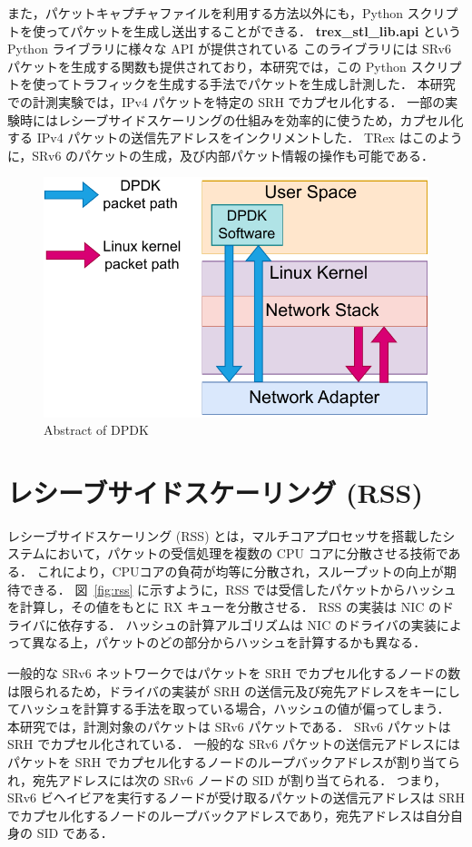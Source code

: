 また，パケットキャプチャファイルを利用する方法以外にも，Python スクリプトを使ってパケットを生成し送出することができる．
\textbf{trex\_stl\_lib.api} という Python ライブラリに様々な API が提供されている
このライブラリには SRv6 パケットを生成する関数も提供されており，本研究では，この Python スクリプトを使ってトラフィックを生成する手法でパケットを生成し計測した．
本研究での計測実験では，IPv4 パケットを特定の SRH でカプセル化する．
一部の実験時にはレシーブサイドスケーリングの仕組みを効率的に使うため，カプセル化する IPv4 パケットの送信先アドレスをインクリメントした．
TRex はこのように，SRv6 のパケットの生成，及び内部パケット情報の操作も可能である．

\begin{figure}[t]
    \centering
    \includegraphics[width=0.95\linewidth]{img/DPDK.pdf}
    \caption{Abstract of DPDK}
    \label{fig:dpdk}
\end{figure}

\section{レシーブサイドスケーリング (RSS)}
\label{sec:rss}
レシーブサイドスケーリング (RSS) とは，マルチコアプロセッサを搭載したシステムにおいて，パケットの受信処理を複数の CPU コアに分散させる技術である．
これにより，CPUコアの負荷が均等に分散され，スループットの向上が期待できる．
図~\ref*{fig:rss} に示すように，RSS では受信したパケットからハッシュを計算し，その値をもとに RX キューを分散させる．
RSS の実装は NIC のドライバに依存する．
ハッシュの計算アルゴリズムは NIC のドライバの実装によって異なる上，パケットのどの部分からハッシュを計算するかも異なる．

一般的な SRv6 ネットワークではパケットを SRH でカプセル化するノードの数は限られるため，ドライバの実装が SRH の送信元及び宛先アドレスをキーにしてハッシュを計算する手法を取っている場合，ハッシュの値が偏ってしまう．
本研究では，計測対象のパケットは SRv6 パケットである．
SRv6 パケットは SRH でカプセル化されている．
一般的な SRv6 パケットの送信元アドレスにはパケットを SRH でカプセル化するノードのループバックアドレスが割り当てられ，宛先アドレスには次の SRv6 ノードの SID が割り当てられる．
つまり，SRv6 ビヘイビアを実行するノードが受け取るパケットの送信元アドレスは SRH でカプセル化するノードのループバックアドレスであり，宛先アドレスは自分自身の SID である．

